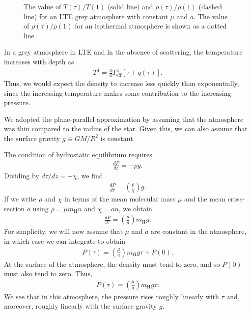 \begin{figure}
\footnotesize
{}
\caption{The value of $T(\tau)/T(1)$ (solid line) and $\rho(\tau)/\rho(1)$ (dashed line) for an LTE grey atmosphere with constant $\mu$ and $a$. The value of $\rho(\tau)/\rho(1)$ for an isothermal atmosphere is shown as a dotted line.}
\label{figure:grey-density}
\end{figure}

In a grey atmosphere in LTE and in the absence of scattering, the temperature increases with depth as
\begin{align}
T^4 = \frac{3}{4}T_\mathrm{eff}^4[\tau + q(\tau)].
\end{align}
Thus, we would expect the density to increase less quickly than exponentially, since the increasing temperature makes some contribution to the increasing pressure.

We adopted the plane-parallel approximation by assuming that the atmosphere was thin compared to the radius of the star. Given this, we can also assume that the surface gravity $g \equiv GM/R^2$ is constant. 

The condition of hydrostatic equilibrium requires
\begin{align}
\frac{dP}{dz} = -\rho g.
\end{align}
Dividing by $d\tau/dz=-\chi$, we find
\begin{align}
\frac{dP}{d\tau} = \left(\frac{\rho}{\chi}\right)g.
\end{align}
If we write $\rho$ and $\chi$ in terms of the mean molecular mass $\mu$ and the mean cross-section $a$ using $\rho = \mu m_\mathrm{H} n$ and $\chi = a n$, we obtain
\begin{align}
\frac{dP}{d\tau} = \left(\frac{\mu }{a}\right)m_\mathrm{H}g.
\end{align}
For simplicity, we will now assume that $\mu$ and $a$ are constant in the atmosphere, in which case we can integrate to obtain
\begin{align}
P(\tau) = \left(\frac{\mu}{a}\right) m_\mathrm{H}g\tau + P(0).
\end{align}
At the surface of the atmosphere, the density must tend to zero, and so $P(0)$ must also tend to zero. Thus,
\begin{align}
P(\tau) = \left(\frac{\mu}{a}\right)m_\mathrm{H}g\tau.
\end{align}
We see that in this atmosphere, the pressure rises roughly linearly with $\tau$ and, moreover, roughly linearly with the surface gravity $g$.

